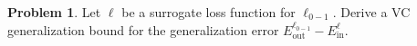 \documentclass[10pt]{exam}
\theoremstyle{definition}
\newtheorem{problem}{Problem}
\newtheorem{note}{Note}
\newtheorem{fact}{Fact}
\newcommand{\Ein}{E_{\text{in}}}
\newcommand{\Eout}{E_{\text{out}}}
\newcommand{\dvc}{{d_{\text{VC}}}}
\begin{document}
\begin{problem}
    Let $\ell$ be a surrogate loss function for $\ell_{0-1}$.
    Derive a VC generalization bound for the generalization error $\Eout^{\ell_{0-1}} - \Ein^{\ell}$.
\end{problem}

%
%
%
%
\end{document}
